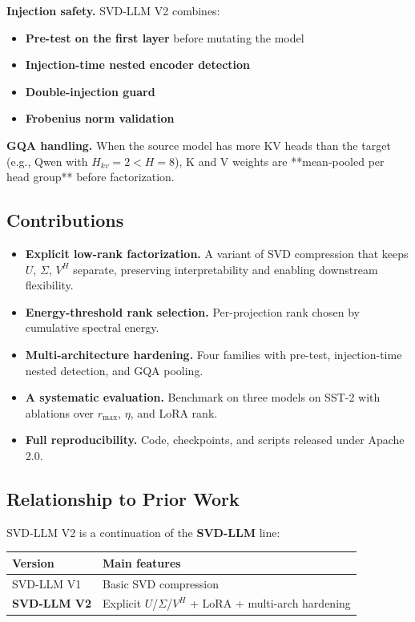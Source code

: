 \textbf{Injection safety.} SVD-LLM V2 combines:
\begin{itemize}
\item \textbf{Pre-test on the first layer} before mutating the model
\item \textbf{Injection-time nested encoder detection}
\item \textbf{Double-injection guard}
\item \textbf{Frobenius norm validation}

\end{itemize}
\textbf{GQA handling.} When the source model has more KV heads than the target 
(e.g., Qwen with $H_{kv} = 2 < H = 8$), K and V weights are **mean-pooled 
per head group** before factorization.

\subsection{Contributions}

\begin{itemize}
\item \textbf{Explicit low-rank factorization.} A variant of SVD compression that
  keeps $U$, $\Sigma$, $V^H$ separate, preserving interpretability and
  enabling downstream flexibility.
\item \textbf{Energy-threshold rank selection.} Per-projection rank chosen by
  cumulative spectral energy.
\item \textbf{Multi-architecture hardening.} Four families with pre-test, injection-time
  nested detection, and GQA pooling.
\item \textbf{A systematic evaluation.} Benchmark on three models on SST-2 with
  ablations over $r_\text{max}$, $\eta$, and LoRA rank.
\item \textbf{Full reproducibility.} Code, checkpoints, and scripts released under
  Apache 2.0.

\end{itemize}
\subsection{Relationship to Prior Work}

SVD-LLM V2 is a continuation of the \textbf{SVD-LLM} line:

\begin{table}[H]
\centering
\small
\begin{tabular}{ll}
\toprule
\textbf{Version} & \textbf{Main features} \\
\midrule
SVD-LLM V1 & Basic SVD compression \\
\textbf{SVD-LLM V2} & Explicit $U$/$\Sigma$/$V^H$ + LoRA + multi-arch hardening \\
\bottomrule
\end{tabular}
\end{table}

